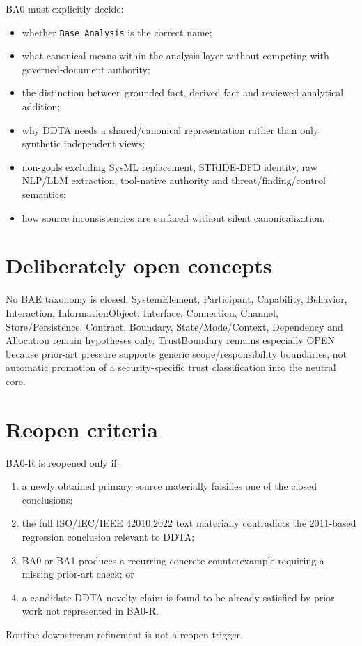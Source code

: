 \documentclass[10pt,a4paper]{article}
\begin{document}
BA0 must explicitly decide:
\begin{itemize}
\item whether \texttt{Base Analysis} is the correct name;
\item what canonical means within the analysis layer without competing with governed-document authority;
\item the distinction between grounded fact, derived fact and reviewed analytical addition;
\item why DDTA needs a shared/canonical representation rather than only synthetic independent views;
\item non-goals excluding SysML replacement, STRIDE-DFD identity, raw NLP/LLM extraction, tool-native authority and threat/finding/control semantics;
\item how source inconsistencies are surfaced without silent canonicalization.
\end{itemize}

\section{Deliberately open concepts}
No BAE taxonomy is closed. SystemElement, Participant, Capability, Behavior, Interaction, InformationObject, Interface, Connection, Channel, Store/Persistence, Contract, Boundary, State/Mode/Context, Dependency and Allocation remain hypotheses only. TrustBoundary remains especially OPEN because prior-art pressure supports generic scope/responsibility boundaries, not automatic promotion of a security-specific trust classification into the neutral core.

\section{Reopen criteria}
BA0-R is reopened only if:
\begin{enumerate}
\item a newly obtained primary source materially falsifies one of the closed conclusions;
\item the full ISO/IEC/IEEE 42010:2022 text materially contradicts the 2011-based regression conclusion relevant to DDTA;
\item BA0 or BA1 produces a recurring concrete counterexample requiring a missing prior-art check; or
\item a candidate DDTA novelty claim is found to be already satisfied by prior work not represented in BA0-R.
\end{enumerate}
Routine downstream refinement is not a reopen trigger.
\end{document}
